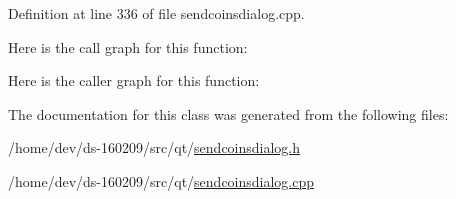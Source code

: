 Definition at line 336 of file sendcoinsdialog.\+cpp.



Here is the call graph for this function\+:




Here is the caller graph for this function\+:




The documentation for this class was generated from the following files\+:\begin{DoxyCompactItemize}
\item 
/home/dev/ds-\/160209/src/qt/\hyperlink{sendcoinsdialog_8h}{sendcoinsdialog.\+h}\item 
/home/dev/ds-\/160209/src/qt/\hyperlink{sendcoinsdialog_8cpp}{sendcoinsdialog.\+cpp}\end{DoxyCompactItemize}
